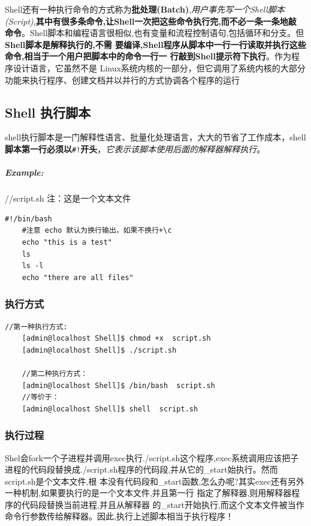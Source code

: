 \documentclass[UTF8,a4paper,12pt]{ctexbook}
\begin{document}
			 Shell还有一种执行命令的方式称为\textbf{批处理(Batch)},\textit{用户事先写一个Shell脚本(Script)},\textbf{其中有很多条命令,让Shell一次把这些命令执行完,而不必一条一条地敲 命令}。Shell脚本和编程语言很相似,也有变量和流程控制语句,包括循环和分支。但\textbf{Shell脚本是解释执行的,不需 要编译,Shell程序从脚本中一行一行读取并执行这些命令,相当于一个用户把脚本中的命令一行一 行敲到Shell提示符下执行}。作为程序设计语言，它虽然不是 Linux系统内核的一部分，但它调用了系统内核的大部分功能来执行程序、创建文档并以并行的方式协调各个程序的运行
		 \subsection{Shell 执行脚本}
			 shell执行脚本是一门解释性语言、批量化处理语言，大大的节省了工作成本，shell\textbf{脚本第一行必须以}\verb|#!|\textbf{开头}，\textit{它表示该脚本使用后面的解释器解释执行}。
			 
			\subparagraph{Example:}
			 //script.sh   注：这是一个文本文件
			 \begin{lstlisting}[frame=L,xleftmargin=.06\textwidth]
	#!/bin/bash
	#注意 echo 默认为换行输出，如果不换行+\c 
	echo "this is a test"	
	ls
	ls -l
	echo "there are all files"
			 \end{lstlisting}
			 
			 \subsubsection{执行方式}
				 \begin{lstlisting}[frame=L,xleftmargin=.06\textwidth]
	//第一种执行方式:
	[admin@localhost Shell]$ chmod +x  script.sh
	[admin@localhost Shell]$ ./script.sh
	
	//第二种执行方式：
	[admin@localhost Shell]$ /bin/bash  script.sh
	//等价于：
	[admin@localhost Shell]$ shell  script.sh
				 \end{lstlisting}
		 
			 \subsubsection{执行过程}
				 Shel会fork一个子进程并调用exec执行./script.sh这个程序,exec系统调用应该把子进程的代码段替换成./script.sh程序的代码段,并从它的\_start始执行。然而script.sh是个文本文件,根 本没有代码段和\_start函数,怎么办呢?其实exec还有另外一种机制,如果要执行的是一个文本文件,并且第一行 指定了解释器,则用解释器程序的代码段替换当前进程,并且从解释器 的\_start开始执行,而这个文本文件被当作命令行参数传给解释器。因此,执行上述脚本相当于执行程序！
				 
\end{document}
